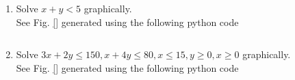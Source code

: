 \begin{enumerate}[label=\arabic*.,ref=\thesubsection.\theenumi]
\item   Solve    $x+y < 5$ graphically.
\\
\solution  See Fig. \ref{} generated using the following python code
\begin{lstlisting}
\end{lstlisting}
%
    \item Solve $3x+2y \leq 150, x+4y \leq 80, x \leq 15, y \geq 0,
    x \geq 0$ graphically.    
\\
\solution  
See Fig. \ref{} generated using the following python code
\begin{lstlisting}
\end{lstlisting}
   
    \end{enumerate}
